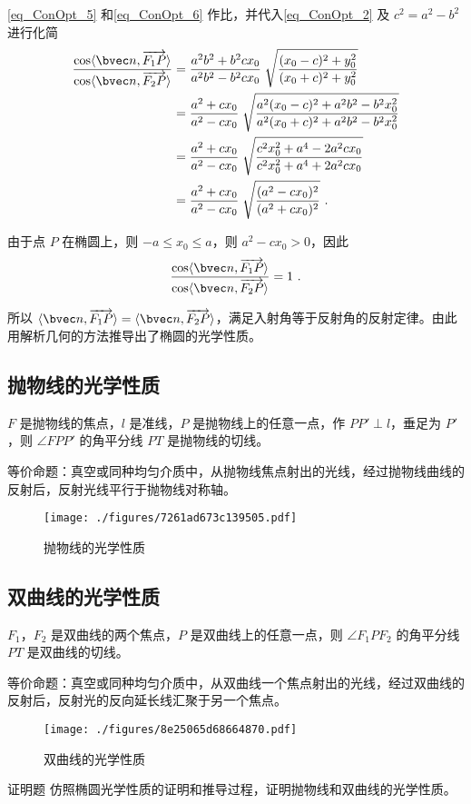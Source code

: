 \autoref{eq_ConOpt_5} 和\autoref{eq_ConOpt_6} 作比，并代入\autoref{eq_ConOpt_2} 及 $c^2=a^2-b^2$ 进行化简
\begin{equation}
\begin{aligned}
\frac{\cos\langle\bvec n,\overrightarrow{F_1P}\rangle}{\cos\langle\bvec n,\overrightarrow{F_2P}\rangle} &=\frac{a^2 b^2+b^2cx_0}{a^2 b^2-b^2cx_0}\; \sqrt{\frac{(x_0-c)^2+y_0^2}{(x_0+c)^2+y_0^2}} \\
&=\frac{a^2+cx_0}{a^2-cx_0}\; \sqrt{\frac{a^2(x_0-c)^2 +a^2 b^2-b^2 x_0^2}{a^2(x_0+c)^2 +a^2 b^2-b^2 x_0^2}} \\
&=\frac{a^2+cx_0}{a^2-cx_0}\; \sqrt{\frac{c^2 x_0^2 + a^4 - 2a^2 c x_0}{c^2 x_0^2 + a^4 + 2a^2 c x_0}} \\
&=\frac{a^2+cx_0}{a^2-cx_0}\; \sqrt{\frac{(a^2-cx_0)^2}{(a^2+cx_0)^2}}~.
\end{aligned}
\end{equation}

由于点 $P$ 在椭圆上，则 $-a\leqslant x_0 \leqslant a$，则 $a^2-cx_0 >0$，因此
\begin{equation}
\frac{\cos\langle\bvec n,\overrightarrow{F_1P}\rangle}{\cos\langle\bvec n,\overrightarrow{F_2P}\rangle}=1~.
\end{equation}

所以 $\langle \bvec n,\overrightarrow{F_1P}\rangle=\langle \bvec n,\overrightarrow{F_2P} \rangle$，满足入射角等于反射角的反射定律。由此用解析几何的方法推导出了椭圆的光学性质。


\subsection{抛物线的光学性质}
$F$ 是抛物线的焦点，$l$ 是准线，$P$ 是抛物线上的任意一点，作 $PP' \perp l$，垂足为 $P'$，则 $\angle FPP' $ 的角平分线 $ PT $ 是抛物线的切线。

等价命题：真空或同种均匀介质中，从抛物线焦点射出的光线，经过抛物线曲线的反射后，反射光线平行于抛物线对称轴。
\begin{figure}[ht]
\centering
\texttt{[image: ./figures/7261ad673c139505.pdf]}
\caption{抛物线的光学性质} \label{fig_ConOpt_4}
\end{figure}

\subsection{双曲线的光学性质}
$F_1$，$F_2$ 是双曲线的两个焦点，$P$ 是双曲线上的任意一点，则 $\angle F_1PF_2 $ 的角平分线 $ PT $ 是双曲线的切线。

等价命题：真空或同种均匀介质中，从双曲线一个焦点射出的光线，经过双曲线的反射后，反射光的反向延长线汇聚于另一个焦点。
\begin{figure}[ht]
\centering
\texttt{[image: ./figures/8e25065d68664870.pdf]}
\caption{双曲线的光学性质} \label{fig_ConOpt_5}
\end{figure}

\begin{exercise}{证明题}\label{exe_ConOpt_1}
仿照椭圆光学性质的证明和推导过程，证明抛物线和双曲线的光学性质。
\end{exercise}
